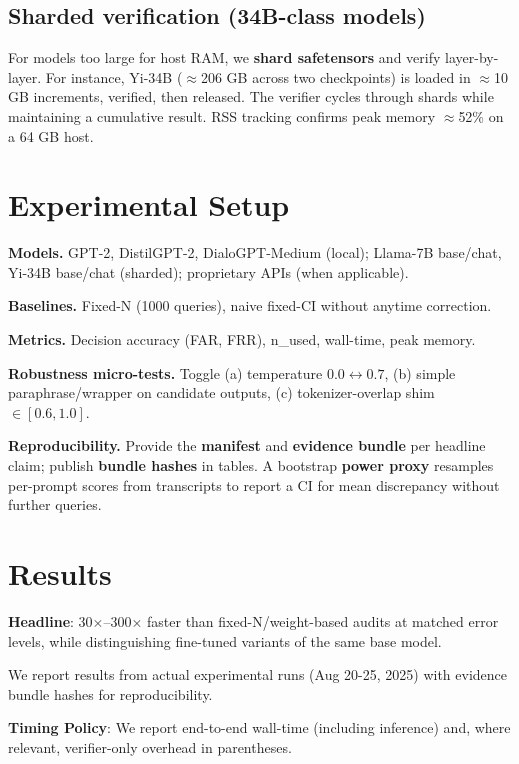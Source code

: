 \documentclass{article}
\begin{document}
\subsection{Sharded verification (34B-class models)}

For models too large for host RAM, we \textbf{shard safetensors} and verify layer-by-layer. For instance, Yi-34B ($\approx$206 GB across two checkpoints) is loaded in $\approx$10 GB increments, verified, then released. The verifier cycles through shards while maintaining a cumulative result. RSS tracking confirms peak memory $\approx$52\% on a 64 GB host.

\section{Experimental Setup}

\textbf{Models.} GPT-2, DistilGPT-2, DialoGPT-Medium (local); Llama-7B base/chat, Yi-34B base/chat (sharded); proprietary APIs (when applicable).

\textbf{Baselines.} Fixed-N (1000 queries), naive fixed-CI without anytime correction.

\textbf{Metrics.} Decision accuracy (FAR, FRR), n\_used, wall-time, peak memory.

\textbf{Robustness micro-tests.} Toggle (a) temperature $0.0 \leftrightarrow 0.7$, (b) simple paraphrase/wrapper on candidate outputs, (c) tokenizer-overlap shim $\in [0.6,1.0]$.

\textbf{Reproducibility.} Provide the \textbf{manifest} and \textbf{evidence bundle} per headline claim; publish \textbf{bundle hashes} in tables. A bootstrap \textbf{power proxy} resamples per-prompt scores from transcripts to report a CI for mean discrepancy without further queries.

\section{Results}
\label{sec:results}

\textbf{Headline}: 30×--300× faster than fixed-N/weight-based audits at matched error levels, while distinguishing fine-tuned variants of the same base model.

We report results from actual experimental runs (Aug 20-25, 2025) with evidence bundle hashes for reproducibility.

\textbf{Timing Policy}: We report end-to-end wall-time (including inference) and, where relevant, verifier-only overhead in parentheses.
\end{document}
